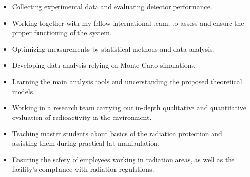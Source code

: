 \documentclass[11pt,a4paper,roman]{moderncv}
\begin{document}
{
    \begin{itemize}
        \item Collecting experimental data and evaluating detector performance.
        \item Working together with my fellow international team, to assess and ensure the proper functioning of the system.
    \end{itemize}
} %

{
    \begin{itemize}
        \item Optimizing measurements by statistical methods and data analysis.
        \item Developing data analysis relying on Monte-Carlo simulations.
        \item Learning the main analysis tools and understanding the proposed theoretical models.
    \end{itemize}
} %


{
    \begin{itemize}
        \item Working in a research team carrying out in-depth qualitative and quantitative evaluation of radioactivity in the environment.
        \item Teaching master students about basics of the radiation protection and assisting them during practical lab manipulation.
        \item Ensuring the safety of employees working in radiation areas, as well as the facility’s compliance with radiation regulations.
    \end{itemize}
} %

\end{document}
